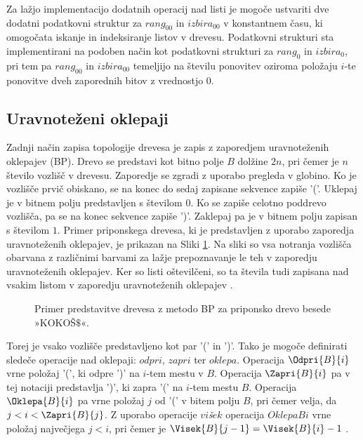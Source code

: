Za lažjo implementacijo dodatnih operacij nad listi je mogoče ustvariti dve dodatni podatkovni struktur za $rang_{00}$ in $izbira_{00}$ v konstantnem času, ki omogočata iskanje in indeksiranje listov v drevesu. Podatkovni strukturi sta implementirani na podoben način kot podatkovni strukturi za $rang_0$ in $izbira_0$, pri tem pa $rang_{00}$ in $izbira_{00}$ temeljijo na številu ponovitev oziroma položaju $i$-te ponovitve dveh zaporednih bitov z vrednostjo 0.

\subsection{Uravnoteženi oklepaji}\label{sec:oklepaji}

Zadnji način zapisa topologije drevesa je zapis z zaporedjem uravnoteženih oklepajev (BP). Drevo se predstavi kot bitno polje $B$ dolžine $2n$, pri čemer je $n$ število vozlišč v drevesu. Zaporedje se zgradi z uporabo pregleda v globino. Ko je vozlišče prvič obiskano, se na konec do sedaj zapisane sekvence zapiše '('. Uklepaj je v bitnem polju predstavljen s številom $0$. Ko se zapiše celotno poddrevo vozlišča, pa se na konec sekvence zapiše ')'. Zaklepaj pa je v bitnem polju zapisan s številom $1$. Primer priponskega drevesa, ki je predstavljen z uporabo zaporedja uravnoteženih oklepajev, je prikazan na Sliki \ref{fig:BP}. Na sliki so vsa notranja vozlišča obarvana z različnimi barvami za lažje prepoznavanje le teh v zaporedju uravnoteženih oklepajev. Ker so listi oštevilčeni, so ta števila tudi zapisana nad vsakim listom v zaporedju uravnoteženih oklepajev \cite{Navarro2016}.

\begin{figure}[htb]
    \begin{center}
        
        \caption{Primer predstavitve drevesa z metodo BP za priponsko drevo besede »KOKOŠ$\$$«.} 
        \label{fig:BP}
    \end{center}
\end{figure}

Torej je vsako vozlišče predstavljeno kot par '(' in ')'. Tako je mogoče definirati sledeče operacije nad oklepaji: $odpri$, $zapri$ ter $oklepa$. Operacija $\Odpri{B}{i}$ vrne položaj '(', ki odpre ')' na $i$-tem mestu v $B$. Operacija $\Zapri{B}{i}$ pa v tej notaciji predstavlja ')', ki zapra '(' na $i$-tem mestu $B$. Operacija $\Oklepa{B}{i}$ pa vrne položaj $j$ od '(' v bitem polju $B$, pri čemer velja, da $j<i<\Zapri{B}{j}$. Z uporabo operacije $vi$\textit{š}$ek$ operacija $Oklepa{B}{i}$ vrne položaj največjega $j<i$, pri čemer je $\Visek{B}{j-1}=\Visek{B}{i}-1$ \cite{Navarro2016}.


